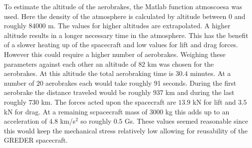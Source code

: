 \qquad To estimate the altitude of the aerobrakes, the Matlab function atmoscoesa was used. Here the density of the atmosphere is calculated by altitude between $0$ and roughly $84000$ m. The values for higher altitudes are extrapolated. A higher altitude results in a longer necessary time in the atmosphere. This has the benefit of a slower heating up of the spacecraft and low values for lift and drag forces. However this could require a higher number of aerobrakes. Weighing these parameters against each other an altitude of $82$ km was chosen for the aerobrakes. At this altitude the total aerobraking time is $30.4$ minutes. At a number of $20$ aerobrakes each would take roughly 91 seconds. During the first aerobrake the distance traveled would be roughly $937$ km and during the last roughly $730$ km. The forces acted upon the spacecraft are $13.9$ kN for lift and $3.5$ kN for drag. At a remaining scpacecraft mass of $3000$ kg this adds up to an acceleration of $4.8$ km/s$^2$ so roughly $0.5$ Gs. These values seemed reasonable since this would keep the mechanical stress relatively low allowing for reusability of the GREDER spacecraft.

